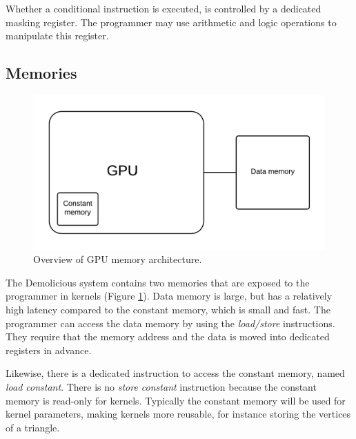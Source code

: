 Whether a conditional instruction is executed, is controlled by a dedicated masking register. 
The programmer may use arithmetic and logic operations to manipulate this register.

\subsection{Memories}

\begin{figure}[H]
	\centering
	\includegraphics[width=\textwidth]{../system_overview/diagrams/memory_overview.png}
	\caption{Overview of GPU memory architecture.}
	\label{fig:memory_overview}
\end{figure}
The Demolicious system contains two memories that are exposed to the programmer in kernels (Figure \ref{fig:memory_overview}).
Data memory is large, but has a relatively high latency compared to the constant memory, which is small and fast.
The programmer can access the data memory by using the \textit{load/store} instructions.
They require that the memory address and the data is moved into dedicated registers in advance.

Likewise, there is a dedicated instruction to access the constant memory, named \textit{load constant}.
There is no \textit{store constant} instruction because the constant memory is read-only for kernels.
Typically the constant memory will be used for kernel parameters, making kernels more reusable,
for instance storing the vertices of a triangle.

